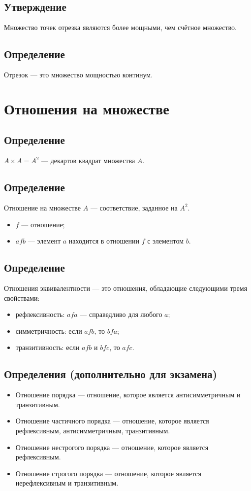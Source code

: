 \documentclass{article}
\begin{document}
\subsection{Утверждение}
Множество точек отрезка являются более мощными, чем счётное множество.


\subsection{Определение}
Отрезок --- это множество мощностью континум.



\section{Отношения на множестве}

\subsection{Определение}
$A \times A = A^2$ --- декартов квадрат множества $A$.


\subsection{Определение}
Отношение на множестве $A$ --- соответствие, заданное на $A^2$.
\begin{itemize}
    \item $f$ --- отношение;
    \item $a f b$ --- элемент $a$ находится в отношении $f$ с элементом $b$.
\end{itemize}


\subsection{Определение}
Отношения эквивалентности --- это отношения, обладающие следующими тремя свойствами:
\begin{itemize}
    \item рефлексивность: $a f a$ --- справедливо для любого $a$;
    \item симметричность: если $a f b$, то $b f a$;
    \item транзитивность: если $a f b$ и $b f c$, то $a f c$.
\end{itemize}


\subsection{Определения (дополнительно для экзамена)}
\begin{itemize}
    \item Отношение порядка --- отношение, которое является антисимметричным и транзитивным.
    \item Отношение частичного порядка --- отношение, которое является рефлексивным, антисимметричным, транзитивным.
    \item Отношение нестрогого порядка --- отношение, которое является рефлексивным.
    \item Отношение строгого порядка --- отношение, которое является нерефлексивным и транзитивным.
\end{itemize}
\end{document}
